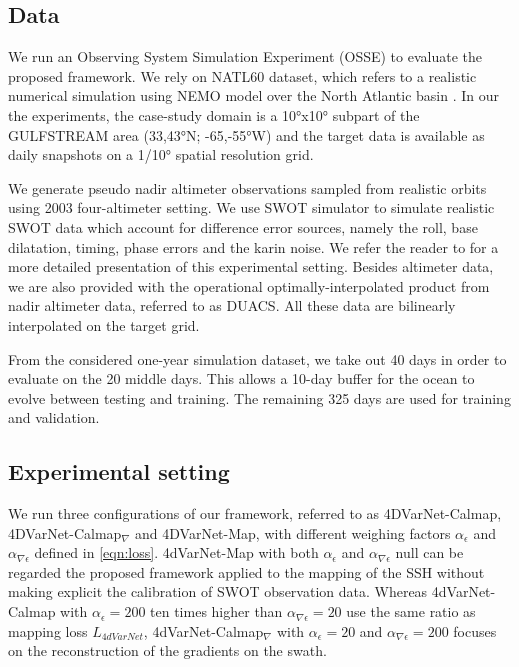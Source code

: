 \documentclass{article}
\begin{document}
\subsection{Data}
We run an Observing System Simulation Experiment  (OSSE) to evaluate the proposed framework.
We rely on NATL60 dataset, which refers to a realistic numerical simulation using NEMO model over the North Atlantic basin \cite{ajayi2020spatial}\cite{ajayi2021diagnosing}. 
In our the experiments, the case-study domain is a 10°x10° subpart of the GULFSTREAM area (33,43°N; -65,-55°W) and the target data is available as daily snapshots on a 1/10° spatial resolution grid.

We generate pseudo nadir altimeter observations sampled from realistic orbits using 2003 four-altimeter setting. We use SWOT simulator \cite{swot_simulator} to simulate realistic SWOT data which account for difference error sources, namely the roll, base dilatation, timing, phase errors and the karin noise. We refer the reader to 
\cite{swot_challenge}\cite{swot_simulator} for a more detailed presentation of this experimental setting. Besides altimeter data, we are also provided with the operational optimally-interpolated product from nadir altimeter data, referred to as DUACS. All these data are bilinearly interpolated on the target grid.

From the considered one-year simulation dataset, we take out 40 days in order to evaluate on the 20 middle days. This allows a 10-day buffer for the ocean to evolve between testing and training. The remaining 325 days are used for training and validation.

\subsection{Experimental setting}
We run three configurations of our framework, referred to as 4DVarNet-Calmap, 4DVarNet-Calmap${}_{\nabla}$ and 4DVarNet-Map, with different weighing factors  $\alpha_{\epsilon}$ and $\alpha_{\nabla\epsilon}$ defined in \ref{eqn:loss}. 
4dVarNet-Map with both $\alpha_{\epsilon}$ and $\alpha_{\nabla\epsilon}$ null can be regarded the proposed framework applied to the mapping of the SSH without making explicit the calibration of SWOT observation data.
Whereas 4dVarNet-Calmap with $\alpha_{\epsilon}=200$ ten times higher than $\alpha_{\nabla\epsilon}=20$ use the same ratio as  mapping loss $L_{4dVarNet}$, 
4dVarNet-Calmap${}_{\nabla}$ with $\alpha_{\epsilon}=20$ and $\alpha_{\nabla\epsilon}=200$ focuses on the reconstruction of the gradients on the swath.
\end{document}
